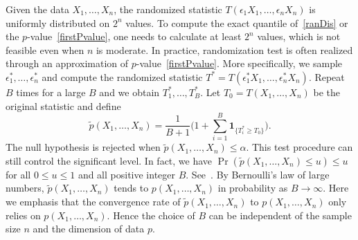\documentclass[3p]{elsarticle}
\theoremstyle{plain}
\theoremstyle{definition}
\theoremstyle{remark}
\begin{document}
 Given the data $X_1,\ldots, X_n$,
 the randomized statistic $T(\epsilon_1 X_1,\ldots,\epsilon_n X_n)$ is uniformly distributed on $2^n$ values.
To compute the exact quantile of~\eqref{ranDis} or the $p$-value~\eqref{firstPvalue}, one needs to calculate at least $2^n$ values, which is not feasible even when $n$ is moderate.
In practice, randomization test is often realized through an approximation of $p$-value~\eqref{firstPvalue}.
More specifically, we sample  $\epsilon_1^*,\ldots,\epsilon_n^*$ and compute the randomized statistic $T^*=T(\epsilon_1^* X_1,\ldots,\epsilon_n^* X_n)$.
Repeat $B$ times for a large $B$ and we obtain $T_1^*,\ldots,T_B^*$.
Let $T_0=T(X_1,\ldots,X_n)$ be the original statistic and define
\begin{equation*}
\tilde{p}(X_1,\ldots,X_n)=\frac{1}{B+1}\big(1+\sum_{i=1}^B \mathbf{1}_{\{T_i^*\geq T_0\}}\big).
\end{equation*}
The null hypothesis is rejected when $\tilde{p}(X_1,\ldots,X_n)\leq \alpha$.
This test procedure can still control the significant level.
In fact, we have
$\Pr(\tilde{p}(X_1,\ldots,X_n)\leq u)\leq u$ for all $0\leq u\leq 1$ and all positive integer $B$.
See~\citet[Page $636$]{Lehmann}.
By Bernoulli's law of large numbers, $\tilde{p}(X_1,\ldots,X_n)$ tends to $p(X_1,\ldots,X_n)$ in probability  as $B\to \infty$.
{Here we emphasis that the convergence rate of $\tilde{p}(X_1,\ldots,X_n)$ to $p(X_1,\ldots,X_n)$ only relies on $p(X_1,\ldots,X_n)$.
Hence the choice of $B$ can be independent of the sample size $n$ and the dimension of data $p$.}
\end{document}
